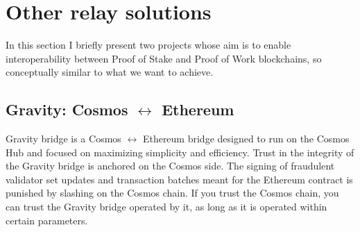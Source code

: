 \section{Other relay solutions}
In this section I briefly present two projects whose aim is to enable interoperability between Proof of Stake and Proof of Work blockchains, so conceptually similar to what we want to achieve. 

\subsection{Gravity: Cosmos $\leftrightarrow$ Ethereum}
Gravity bridge is a Cosmos $\leftrightarrow$ Ethereum bridge designed to run on the Cosmos Hub and focused on maximizing simplicity and efficiency. Trust in the integrity of the Gravity bridge is anchored on the Cosmos side. The signing of fraudulent validator set updates and transaction batches meant for the Ethereum contract is punished by slashing on the Cosmos chain. If you trust the Cosmos chain, you can trust the Gravity bridge operated by it, as long as it is operated within certain parameters. 

